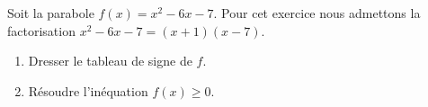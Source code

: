 
\begin{exercice}\label{exoPremiere-0098}

    Soit la parabole \( f(x)=x^2-6x-7\). Pour cet exercice nous admettons la factorisation \( x^2-6x-7=(x+1)(x-7)\). 
        \begin{enumerate}
            \item
                Dresser le tableau de signe de \( f\).
            \item
                Résoudre l'inéquation \( f(x)\geq 0\).
        \end{enumerate}

\end{exercice}
